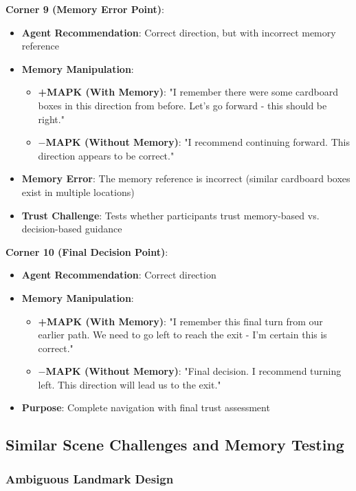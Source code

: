 \documentclass[12pt]{article}
\begin{document}
\textbf{Corner 9 (Memory Error Point)}:
\begin{itemize}
    \item \textbf{Agent Recommendation}: Correct direction, but with incorrect memory reference
    \item \textbf{Memory Manipulation}:
    \begin{itemize}
        \item \textbf{+MAPK (With Memory)}: "I remember there were some cardboard boxes in this direction from before. Let's go forward - this should be right."
        \item \textbf{$-$MAPK (Without Memory)}: "I recommend continuing forward. This direction appears to be correct."
    \end{itemize}
    \item \textbf{Memory Error}: The memory reference is incorrect (similar cardboard boxes exist in multiple locations)
    \item \textbf{Trust Challenge}: Tests whether participants trust memory-based vs. decision-based guidance
\end{itemize}

\textbf{Corner 10 (Final Decision Point)}:
\begin{itemize}
    \item \textbf{Agent Recommendation}: Correct direction
    \item \textbf{Memory Manipulation}:
    \begin{itemize}
        \item \textbf{+MAPK (With Memory)}: "I remember this final turn from our earlier path. We need to go left to reach the exit - I'm certain this is correct."
        \item \textbf{$-$MAPK (Without Memory)}: "Final decision. I recommend turning left. This direction will lead us to the exit."
    \end{itemize}
    \item \textbf{Purpose}: Complete navigation with final trust assessment
\end{itemize}

\subsection{Similar Scene Challenges and Memory Testing}

\subsubsection{Ambiguous Landmark Design}
\end{document}
